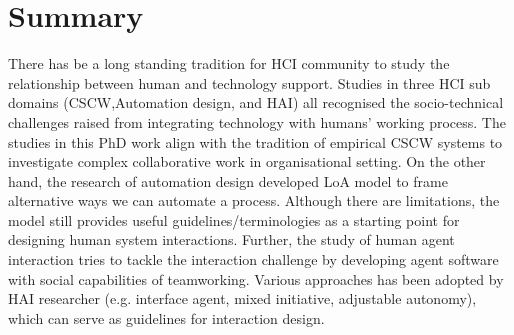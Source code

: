

\section{Summary}


There has be a long standing tradition for \ac{HCI} community to study the relationship between human and technology support. Studies in three \ac{HCI} sub domains (\ac{CSCW},Automation design, and \acf{HAI}) all recognised the socio-technical challenges raised from integrating technology with humans' working process. The studies in this PhD work align with the tradition of empirical \ac{CSCW} systems to investigate complex collaborative work in organisational setting.  On the other hand, the research of automation design developed \ac{LoA} model to frame alternative ways we can automate a process. Although there are limitations, the model still provides useful guidelines/terminologies as a starting point for designing human system interactions. Further, the study of human agent interaction tries to tackle the interaction challenge by developing agent software with social capabilities of teamworking. Various approaches has been adopted by \ac{HAI} researcher (e.g. interface agent, mixed initiative, adjustable autonomy), which can serve as guidelines for interaction design.\\

